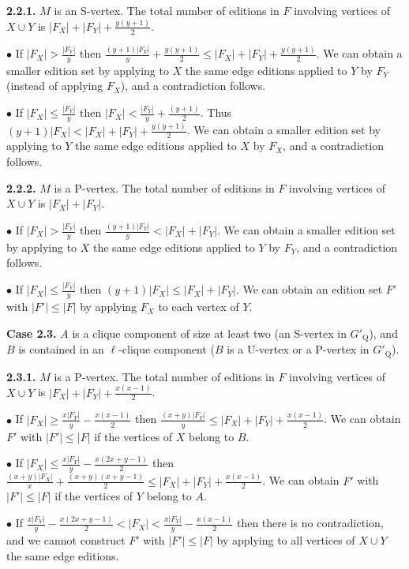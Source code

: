 \documentclass[12pt]{article}
\begin{document}
\textbf{2.2.1.} $M$ is an S-vertex. The total number of editions
in $F$ involving vertices of $X \cup Y$ is $|F_X|+|F_Y|+
\frac{y(y+1)}{2}$.

$\bullet$ If $|F_X| > \frac{|F_Y|}{y}$ then $\frac{(y+1)|F_Y|}{y}
+ \frac{y(y+1)}{2} \leq |F_X|+|F_Y|+ \frac{y(y+1)}{2}$. We can
obtain a smaller edition set by applying to $X$ the same edge
editions applied to $Y$ by $F_Y$ (instead of applying $F_X$), and
a contradiction follows.

$\bullet$ If  $|F_X| \leq \frac{|F_Y|}{y}$ then $|F_X| <
\frac{|F_Y|}{y}+ \frac{(y+1)}{2}$. Thus $(y+1)|F_X| < |F_X|+|F_Y|+
\frac{y(y+1)}{2}$. We can obtain a smaller edition set by
applying to $Y$ the same edge editions applied to $X$ by $F_X$,
and a contradiction follows.

\textbf{2.2.2.} $M$ is a P-vertex. The total number of editions in
$F$ involving vertices of $X \cup Y$ is $|F_X|+|F_Y|$.

$\bullet$ If $|F_X| > \frac{|F_Y|}{y}$ then $\frac{(y+1)|F_Y|}{y}
< |F_X|+|F_Y|$. We can obtain a smaller edition set by
applying to $X$ the same edge editions applied to $Y$ by $F_Y$,
and a contradiction follows.

$\bullet$ If  $|F_X| \leq \frac{|F_Y|}{y}$ then $(y+1)|F_X| \leq
|F_X|+|F_Y|$. We can obtain an edition set $F'$ with
$|F'|\leq|F|$ by applying $F_X$ to each vertex of $Y$.

\textbf{Case 2.3.} $A$ is a clique component of size at least two
(an S-vertex in $G'_{\mathrm Q}$), and $B$ is contained in an
$\ell$-clique component ($B$ is a U-vertex or a P-vertex in
$G'_{\mathrm Q}$).

\textbf{2.3.1.} $M$ is a P-vertex. The total number of editions in
$F$ involving vertices of $X \cup Y$ is
$|F_X|+|F_Y|+\frac{x(x-1)}{2}$.

$\bullet$ If $|F_X| \geq \frac{x|F_Y|}{y}- \frac{x(x-1)}{2}$ then
$\frac{(x+y)|F_Y|}{y} \leq |F_X|+|F_Y|+ \frac{x(x-1)}{2}$. We can
obtain $F'$ with $|F'|\leq |F|$ if the vertices of $X$ belong to
$B$.

$\bullet$ If $|F_X|\leq \frac{x|F_Y|}{y} - \frac{x(2x +y-1)}{2}$ then $\frac{(x+y)|F_X|}{x} + \frac{(x+y)(x+y-1)}{2} \leq
|F_X|+|F_Y|+ \frac{x(x-1)}{2}$. We can obtain $F'$ with $|F'|\leq
|F|$ if the vertices of $Y$ belong to $A$.

$\bullet$ If $\frac{x|F_Y|}{y}- \frac{x(2x+y-1)}{2} < |F_X|<
\frac{x|F_Y|}{y} - \frac{x(x-1)}{2}$ then there is no
contradiction, and we cannot construct $F'$ with $|F'| \leq |F|$ by
applying to all vertices of $X \cup Y$ the same edge editions.
\end{document}
